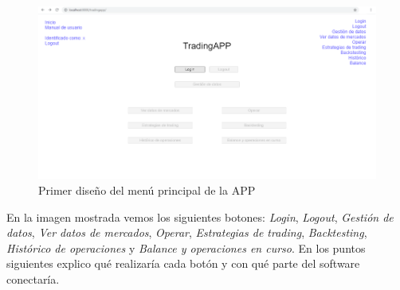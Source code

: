 \begin{figure}[h] 
	\includegraphics[width=1.2\textwidth]{imagenes/menu_principal.png}
	\caption{Primer diseño del menú principal de la APP} \label{menu_principal}
\end{figure}

En la imagen mostrada vemos los siguientes botones: \textit{Login}, \textit{Logout}, \textit{Gestión de datos}, \textit{Ver datos de mercados}, \textit{Operar}, \textit{Estrategias de trading}, \textit{Backtesting}, \textit{Histórico de operaciones} y \textit{Balance y operaciones en curso}. En los puntos siguientes explico qué realizaría cada botón y con qué parte del software conectaría.\newline

